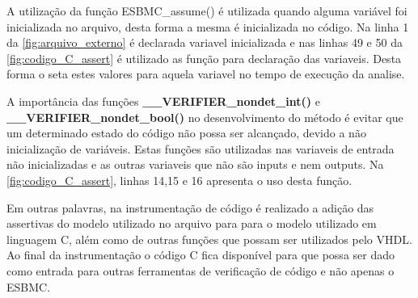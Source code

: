 \par
A utilização da função ESBMC\_assume() é utilizada quando alguma variável foi inicializada no arquivo, desta forma a mesma é inicializada no código. Na linha 1 da \autoref{fig:arquivo_externo} é declarada variavel inicializada e nas linhas 49 e 50 da \autoref{fig:codigo_C_assert} é utilizado as função para declaração das variaveis. Desta forma o seta estes valores para aquela variavel no tempo de execução da analise.

\par
A importância das funções \textbf{\_\_VERIFIER\_nondet\_int()} e \textbf{\_\_VERIFIER\_nondet\_bool()} no desenvolvimento do método é evitar que um determinado estado do código não possa ser alcançado, devido a não inicialização de variáveis. Estas funções são utilizadas nas variaveis de entrada não inicializadas e as outras variaveis que não são inputs e nem outputs. Na \autoref{fig:codigo_C_assert}, linhas 14,15 e 16 apresenta o uso desta função.

\par
Em outras palavras, na instrumentação de código é realizado a adição das assertivas do modelo utilizado no arquivo para para o modelo utilizado em linguagem C, além como de outras funções que possam ser utilizados pelo VHDL. Ao final da instrumentação o código C fica disponível para que possa ser dado como entrada para outras ferramentas de verificação de código e não apenas o ESBMC.

